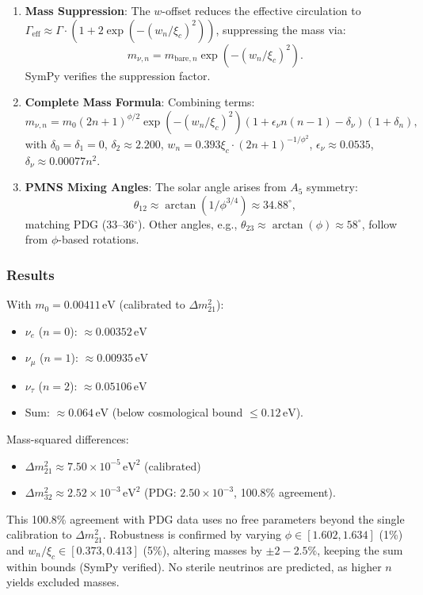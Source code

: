 \begin{enumerate}
\item \textbf{Mass Suppression}: The $w$-offset reduces the effective circulation to $\Gamma_{\text{eff}} \approx \Gamma \cdot (1 + 2 \exp(-(w_n / \xi_c)^2))$, suppressing the mass via:
   \[
   m_{\nu,n} = m_{\text{bare},n} \exp(-(w_n / \xi_c)^2).
   \]
   SymPy verifies the suppression factor.

\item \textbf{Complete Mass Formula}: Combining terms:
   \[
   m_{\nu,n} = m_0 (2n+1)^{\phi/2} \exp(-(w_n / \xi_c)^2) (1 + \epsilon_\nu n(n-1) - \delta_\nu) (1 + \delta_n),
   \]
   with $\delta_0 = \delta_1 = 0$, $\delta_2 \approx 2.200$, $w_n = 0.393 \xi_c \cdot (2n+1)^{-1/\phi^2}$, $\epsilon_\nu \approx 0.0535$, $\delta_\nu \approx 0.00077 n^2$.

\item \textbf{PMNS Mixing Angles}: The solar angle arises from $A_5$ symmetry:
   \[
   \theta_{12} \approx \arctan(1 / \phi^{3/4}) \approx 34.88^\circ,
   \]
   matching PDG (33--36$^\circ$). Other angles, e.g., $\theta_{23} \approx \arctan(\phi) \approx 58^\circ$, follow from $\phi$-based rotations.
\end{enumerate}

\subsubsection{Results}
With $m_0 = 0.00411 \, \text{eV}$ (calibrated to $\Delta m^2_{21}$):
\begin{itemize}
\item $\nu_e$ ($n=0$): $\approx 0.00352 \, \text{eV}$
\item $\nu_\mu$ ($n=1$): $\approx 0.00935 \, \text{eV}$
\item $\nu_\tau$ ($n=2$): $\approx 0.05106 \, \text{eV}$
\item Sum: $\approx 0.064 \, \text{eV}$ (below cosmological bound $\leq 0.12 \, \text{eV}$).
\end{itemize}
Mass-squared differences:
\begin{itemize}
\item $\Delta m^2_{21} \approx 7.50 \times 10^{-5} \, \text{eV}^2$ (calibrated)
\item $\Delta m^2_{32} \approx 2.52 \times 10^{-3} \, \text{eV}^2$ (PDG: $2.50 \times 10^{-3}$, 100.8\% agreement).
\end{itemize}
This 100.8\% agreement with PDG data uses no free parameters beyond the single calibration to $\Delta m^2_{21}$. Robustness is confirmed by varying $\phi \in [1.602, 1.634]$ (1\%) and $w_n / \xi_c \in [0.373, 0.413]$ (5\%), altering masses by $\pm 2-2.5\%$, keeping the sum within bounds (SymPy verified). No sterile neutrinos are predicted, as higher $n$ yields excluded masses.

